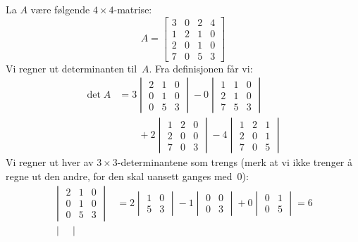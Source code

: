 \begin{ex}
\label{ex:det-4x4}
La $A$ være følgende $4 \times 4$-matrise:
\[
A =
\begin{bmatrix}
3 & 0 & 2 & 4 \\
1 & 2 & 1 & 0 \\
2 & 0 & 1 & 0 \\
7 & 0 & 5 & 3
\end{bmatrix}
\]
Vi regner ut determinanten til~$A$.  Fra definisjonen får vi:
\begin{align*}
\det A &=
3 \begin{vmatrix}
2 & 1 & 0 \\
0 & 1 & 0 \\
0 & 5 & 3
\end{vmatrix}
- 0 \begin{vmatrix}
1 & 1 & 0 \\
2 & 1 & 0 \\
7 & 5 & 3
\end{vmatrix}
\\
&\qquad
+ 2 \begin{vmatrix}
1 & 2 & 0 \\
2 & 0 & 0 \\
7 & 0 & 3
\end{vmatrix}
- 4 \begin{vmatrix}
1 & 2 & 1 \\
2 & 0 & 1 \\
7 & 0 & 5
\end{vmatrix}
\end{align*}
Vi regner ut hver av $3 \times 3$-determinantene som trengs (merk at
vi ikke trenger å regne ut den andre, for den skal uansett ganges
med~$0$):
\begin{align*}
\begin{vmatrix}
2 & 1 & 0 \\
0 & 1 & 0 \\
0 & 5 & 3
\end{vmatrix}
&=
  2 \begin{vmatrix} 1 & 0 \\ 5 & 3 \end{vmatrix}
- 1 \begin{vmatrix} 0 & 0 \\ 0 & 3 \end{vmatrix}
+ 0 \begin{vmatrix} 0 & 1 \\ 0 & 5 \end{vmatrix}
 = 6 \\
\begin{vmatrix}

\end{vmatrix}
\end{align*}
\end{ex}
